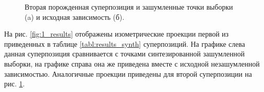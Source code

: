 \documentclass[12pt,a4paper]{article}
\begin{document}
\begin{figure}[h]
  \centering
  \caption{Вторая порожденная суперпозиция и зашумленные точки выборки (a) и исходная зависимость (б).}
  \label{fig:2_results}
\end{figure}

На рис. \ref{fig:1_results} отображены изометрические
проекции первой из приведенных в таблице \ref{tabl:results_synth} суперпозиций. На
графике слева данная суперпозиция сравнивается с точками синтезированной
зашумленной выборки, на графике справа она же приведена вместе
с исходной незашумленной зависимостью. Аналогичные проекции
приведены для второй суперпозиции на рис. \ref{fig:2_results}.
\end{document}

